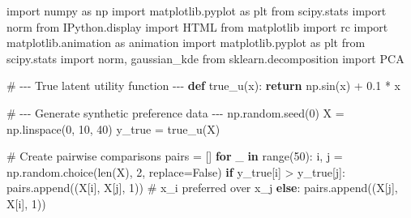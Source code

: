 \documentclass[
  letterpaper,
  numbers=noenddot,
  DIV=11]{scrreprt}
\newenvironment{Shaded}{\begin{snugshade}}{\end{snugshade}}
\newcommand{\BuiltInTok}[1]{\textcolor[rgb]{0.00,0.23,0.31}{#1}}
\newcommand{\CommentTok}[1]{\textcolor[rgb]{0.37,0.37,0.37}{#1}}
\newcommand{\ControlFlowTok}[1]{\textcolor[rgb]{0.00,0.23,0.31}{\textbf{#1}}}
\newcommand{\DecValTok}[1]{\textcolor[rgb]{0.68,0.00,0.00}{#1}}
\newcommand{\FloatTok}[1]{\textcolor[rgb]{0.68,0.00,0.00}{#1}}
\newcommand{\ImportTok}[1]{\textcolor[rgb]{0.00,0.46,0.62}{#1}}
\newcommand{\KeywordTok}[1]{\textcolor[rgb]{0.00,0.23,0.31}{\textbf{#1}}}
\newcommand{\NormalTok}[1]{\textcolor[rgb]{0.00,0.23,0.31}{#1}}
\newcommand{\OperatorTok}[1]{\textcolor[rgb]{0.37,0.37,0.37}{#1}}
\newcommand{\VariableTok}[1]{\textcolor[rgb]{0.07,0.07,0.07}{#1}}
\theoremstyle{plain}
\theoremstyle{definition}
\theoremstyle{remark}
\begin{document}
\begin{Shaded}
\begin{Highlighting}[numbers=left,,]
\ImportTok{import}\NormalTok{ numpy }\ImportTok{as}\NormalTok{ np}
\ImportTok{import}\NormalTok{ matplotlib.pyplot }\ImportTok{as}\NormalTok{ plt}
\ImportTok{from}\NormalTok{ scipy.stats }\ImportTok{import}\NormalTok{ norm}
\ImportTok{from}\NormalTok{ IPython.display }\ImportTok{import}\NormalTok{ HTML}
\ImportTok{from}\NormalTok{ matplotlib }\ImportTok{import}\NormalTok{ rc}
\ImportTok{import}\NormalTok{ matplotlib.animation }\ImportTok{as}\NormalTok{ animation}
\ImportTok{import}\NormalTok{ matplotlib.pyplot }\ImportTok{as}\NormalTok{ plt}
\ImportTok{from}\NormalTok{ scipy.stats }\ImportTok{import}\NormalTok{ norm, gaussian\_kde}
\ImportTok{from}\NormalTok{ sklearn.decomposition }\ImportTok{import}\NormalTok{ PCA}

\CommentTok{\# {-}{-}{-} True latent utility function {-}{-}{-}}
\KeywordTok{def}\NormalTok{ true\_u(x):}
    \ControlFlowTok{return}\NormalTok{ np.sin(x) }\OperatorTok{+} \FloatTok{0.1} \OperatorTok{*}\NormalTok{ x}

\CommentTok{\# {-}{-}{-} Generate synthetic preference data {-}{-}{-}}
\NormalTok{np.random.seed(}\DecValTok{0}\NormalTok{)}
\NormalTok{X }\OperatorTok{=}\NormalTok{ np.linspace(}\DecValTok{0}\NormalTok{, }\DecValTok{10}\NormalTok{, }\DecValTok{40}\NormalTok{)}
\NormalTok{y\_true }\OperatorTok{=}\NormalTok{ true\_u(X)}

\CommentTok{\# Create pairwise comparisons}
\NormalTok{pairs }\OperatorTok{=}\NormalTok{ []}
\ControlFlowTok{for}\NormalTok{ \_ }\KeywordTok{in} \BuiltInTok{range}\NormalTok{(}\DecValTok{50}\NormalTok{):}
\NormalTok{    i, j }\OperatorTok{=}\NormalTok{ np.random.choice(}\BuiltInTok{len}\NormalTok{(X), }\DecValTok{2}\NormalTok{, replace}\OperatorTok{=}\VariableTok{False}\NormalTok{)}
    \ControlFlowTok{if}\NormalTok{ y\_true[i] }\OperatorTok{\textgreater{}}\NormalTok{ y\_true[j]:}
\NormalTok{        pairs.append((X[i], X[j], }\DecValTok{1}\NormalTok{))  }\CommentTok{\# x\_i preferred over x\_j}
    \ControlFlowTok{else}\NormalTok{:}
\NormalTok{        pairs.append((X[j], X[i], }\DecValTok{1}\NormalTok{))}


\end{Highlighting}
\end{Shaded}
\end{document}
